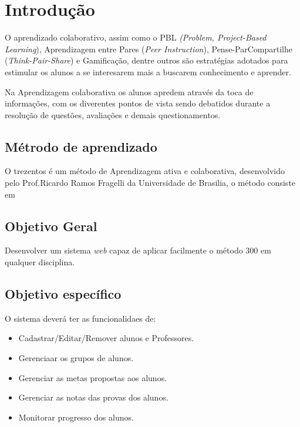 \chapter[Introdução]{Introdução}
O aprendizado colaborativo, assim como o PBL \textit{(Problem,
Project-Based Learning}), Aprendizagem entre Pares (\textit{Peer Instruction}), Pense-ParCompartilhe (\textit{Think-Pair-Share}) e Gamificação, dentre outros são estratégias adotados para estimular os alunos a se interesarem mais a buscarem conhecimento e aprender.

Na Aprendizagem colaborativa os alunos apredem através da toca de informações, com os diverentes pontos de vista sendo debatidos durante a resolução de questões, avaliações e demais questionamentos. \cite{lupion2004grupos}

\section{Métrodo de aprendizado}
O trezentos é um método de Aprendizagem ativa e colaborativa, desenvolvido pelo Prof.Ricardo Ramos Fragelli da Universidade de Brasilia, o método consiste em 


\section{Objetivo Geral}
Desenvolver um sistema \textit{web} capaz de aplicar facilmente o método 300 em qualquer disciplina.

\section{Objetivo específico}
O sistema deverá ter as funcionalidaes de:
\begin{itemize}
    \item Cadastrar/Editar/Remover alunos e Professores.
    \item Gerenciaar os grupos de alunos.
    \item Gerenciar as metas propostas aos alunos.
    \item Gerenciar as notas das provas dos alunos.
    \item Monitorar progresso dos alunos.
\end{itemize}